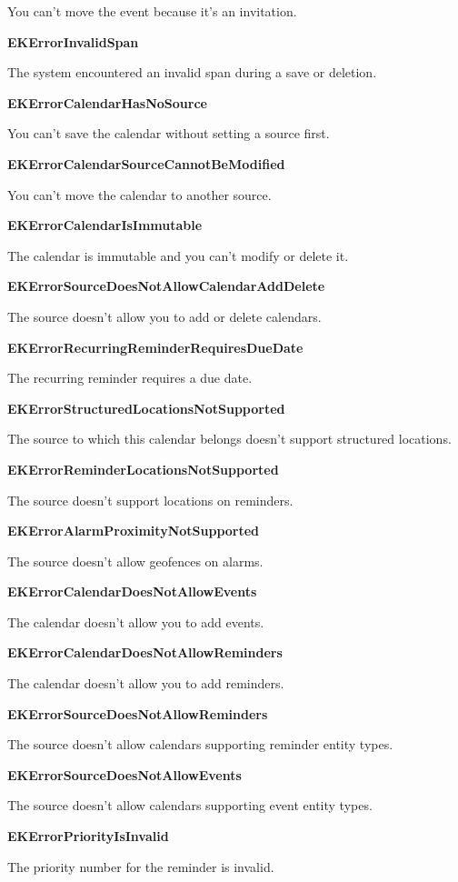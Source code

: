 \documentclass{article}
\begin{document}
You can't move the event because it's an invitation.

\textbf{EKErrorInvalidSpan}

The system encountered an invalid span during a save or deletion.

\textbf{EKErrorCalendarHasNoSource}

You can't save the calendar without setting a source first.

\textbf{EKErrorCalendarSourceCannotBeModified}

You can't move the calendar to another source.

\textbf{EKErrorCalendarIsImmutable}

The calendar is immutable and you can't modify or delete it.

\textbf{EKErrorSourceDoesNotAllowCalendarAddDelete}

The source doesn't allow you to add or delete calendars.

\textbf{EKErrorRecurringReminderRequiresDueDate}

The recurring reminder requires a due date.

\textbf{EKErrorStructuredLocationsNotSupported}

The source to which this calendar belongs doesn't support structured locations.

\textbf{EKErrorReminderLocationsNotSupported}

The source doesn't support locations on reminders.

\textbf{EKErrorAlarmProximityNotSupported}

The source doesn't allow geofences on alarms.

\textbf{EKErrorCalendarDoesNotAllowEvents}

The calendar doesn't allow you to add events.

\textbf{EKErrorCalendarDoesNotAllowReminders}

The calendar doesn't allow you to add reminders.

\textbf{EKErrorSourceDoesNotAllowReminders}

The source doesn't allow calendars supporting reminder entity types.

\textbf{EKErrorSourceDoesNotAllowEvents}

The source doesn't allow calendars supporting event entity types.

\textbf{EKErrorPriorityIsInvalid}

The priority number for the reminder is invalid.
\end{document}
